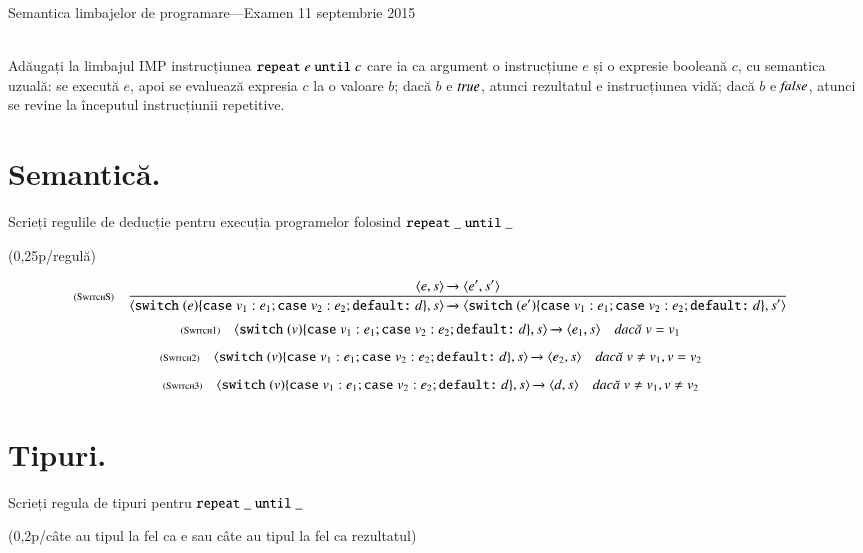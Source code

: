 \documentclass[addpoints,12pt,a4paper,answers]{exam}
\newcommand{\getHeight}[1]{%
#1%
}
\newenvironment{solutie}{\par\hspace*{-9em}\begin{minipage}{.98\paperwidth}
\hrulefill {\bf Rezolvare} \hrulefill}{\hrulefill\end{minipage}}
\begin{document}
\begin{center}


Semantica limbajelor de programare---Examen \hfill  11 septembrie 2015 \\ \ \\

\end{center}


\begin{questions}
Adăugați la limbajul IMP instrucțiunea $\mathrel{\text{\ttfamily repeat}} e \mathrel{\text{\ttfamily until}} c$ care ia ca argument o instrucțiune $e$ și o expresie booleană $c$, cu semantica uzuală: se execută $e$, apoi se evaluează expresia $c$ la o valoare $b$; dacă  $b$ e ${\it true}$, atunci rezultatul e instrucțiunea vidă; dacă $b$ e ${\it false}$, atunci se revine la începutul instrucțiunii repetitive.
\begin{parts}
\part[\half] {\bf Semantică. } Scrieți regulile de deducție pentru execuția programelor folosind $\mathrel{\text{\ttfamily repeat}}\_\mathrel{\text{\ttfamily until}}\_$ 
\getHeight{
\begin{solutie}
(0,25p/regulă)

\[
\reg[SwitchS]{
\Ss
{\c{\terminal{switch}(e)\{\terminal{case} v_1: e_1; \terminal{case} v_2: e_2; \terminal{default:} d\},s}}
{\c{\terminal{switch}(e')\{\terminal{case} v_1: e_1; \terminal{case} v_2: e_2; \terminal{default:} d\},s'}}
}{
\Ss
{\c{e,s}}
{\c{e',s'}}
}{}
\]
\[
\reg[Switch1]{
\Ss
{\c{\terminal{switch}(v)\{\terminal{case} v_1: e_1; \terminal{case} v_2: e_2; \terminal{default:} d\},s}}
{\c{e_1,s}}}{}{v=v_1}
\]
\[
\reg[Switch2]{
\Ss
{\c{\terminal{switch}(v)\{\terminal{case} v_1: e_1; \terminal{case} v_2: e_2; \terminal{default:} d\},s}}
{\c{e_2,s}}}{}{v\neq v_1, v = v_2}
\]
\[
\reg[Switch3]{
\Ss
{\c{\terminal{switch}(v)\{\terminal{case} v_1: e_1; \terminal{case} v_2: e_2; \terminal{default:} d\},s}}
{\c{d,s}}}{}{v\neq v_1, v \neq v_2}
\]
\end{solutie}
}
\part[\half] {\bf Tipuri. } Scrieți regula de tipuri pentru $\mathrel{\text{\ttfamily repeat}}\_\mathrel{\text{\ttfamily until}}\_$
\getHeight{
\begin{solutie}
(0,2p/câte au tipul la fel ca e sau câte au tipul la fel ca rezultatul)


\end{solutie}}
\end{parts}
\end{questions}
\end{document}

